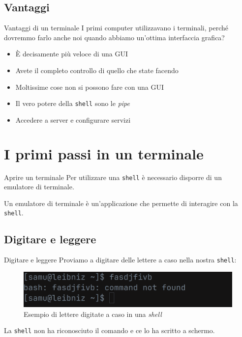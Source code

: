\documentclass{beamer}
\begin{document}
\subsection{Vantaggi}
\begin{frame}{Vantaggi di un terminale}
  I primi computer utilizzavano i terminali, perché dovremmo farlo anche noi
  quando abbiamo un'ottima interfaccia grafica?\bigskip

  \begin{itemize}
    \item <1-> È decisamente più veloce di una GUI
    \item <2-> Avete il completo controllo di quello che state facendo
    \item <3-> Moltissime cose non si possono fare con una GUI
    \item <3-> Il vero potere della \texttt{shell} sono le \textit{pipe}
    \item <3-> Accedere a server e configurare servizi
  \end{itemize}
\end{frame}

\section{I primi passi in un terminale}
\begin{frame}{Aprire un terminale}
  Per utilizzare una \texttt{shell} è necessario disporre di un emulatore di 
  terminale.\bigskip

  Un emulatore di terminale è un'applicazione che permette di interagire con
  la \texttt{shell}.
\end{frame}

\subsection{Digitare e leggere}
\begin{frame}{Digitare e leggere}
  Proviamo a digitare delle lettere a caso nella nostra \texttt{shell}:
  \begin{figure}
    \includegraphics[width=\textwidth]{assets/random-letters-shell.png}
    \caption{Esempio di lettere digitate a caso in una \textit{shell}}
  \end{figure}
  \pause
  La \texttt{shell} non ha riconosciuto il comando e ce lo ha scritto a schermo.
\end{frame}
\end{document}
